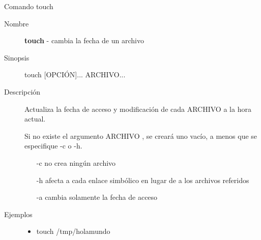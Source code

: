 \begin{frame}[c]{Comando touch}
  \begin{description}
    \item[Nombre]
      \textbf{touch} - cambia la fecha de un archivo

    \vspace{\baselineskip}
    \item[Sinopsis]
      touch [OPCIÓN]... ARCHIVO...

    \vspace{\baselineskip}
    \item[Descripción]
      Actualiza la fecha de acceso y modificación de cada ARCHIVO a la hora
      actual.

      Si no existe el argumento ARCHIVO , se creará uno vacío, a menos que
      se especifique -c o -h.

      \begin{itemize}
        \item [-c] no crea ningún archivo
        \item [-h] afecta a cada enlace simbólico en lugar de a los
          archivos referidos
        \item [-a] cambia solamente la fecha de acceso
      \end{itemize}

    \vspace{\baselineskip}
    \item[Ejemplos]
      \begin{itemize}
        \item touch /tmp/holamundo
      \end{itemize}
  \end{description}
\end{frame}


